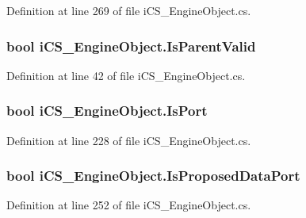 Definition at line 269 of file i\+C\+S\+\_\+\+Engine\+Object.\+cs.

\hypertarget{classi_c_s___engine_object_a1e7c0aca435474537a8067ede1f25d89}{
\subsubsection[{Is\+Parent\+Valid}]{\setlength{\rightskip}{0pt plus 5cm}bool i\+C\+S\+\_\+\+Engine\+Object.\+Is\+Parent\+Valid\hspace{0.3cm}{\ttfamily [get]}}}\label{classi_c_s___engine_object_a1e7c0aca435474537a8067ede1f25d89}


Definition at line 42 of file i\+C\+S\+\_\+\+Engine\+Object.\+cs.

\hypertarget{classi_c_s___engine_object_a77984d6277ad1bdc00d086e892b148b3}{
\subsubsection[{Is\+Port}]{\setlength{\rightskip}{0pt plus 5cm}bool i\+C\+S\+\_\+\+Engine\+Object.\+Is\+Port\hspace{0.3cm}{\ttfamily [get]}}}\label{classi_c_s___engine_object_a77984d6277ad1bdc00d086e892b148b3}


Definition at line 228 of file i\+C\+S\+\_\+\+Engine\+Object.\+cs.

\hypertarget{classi_c_s___engine_object_aa9ad9dd26f3b900b20a0cad82fcd03fc}{
\subsubsection[{Is\+Proposed\+Data\+Port}]{\setlength{\rightskip}{0pt plus 5cm}bool i\+C\+S\+\_\+\+Engine\+Object.\+Is\+Proposed\+Data\+Port\hspace{0.3cm}{\ttfamily [get]}}}\label{classi_c_s___engine_object_aa9ad9dd26f3b900b20a0cad82fcd03fc}


Definition at line 252 of file i\+C\+S\+\_\+\+Engine\+Object.\+cs.

